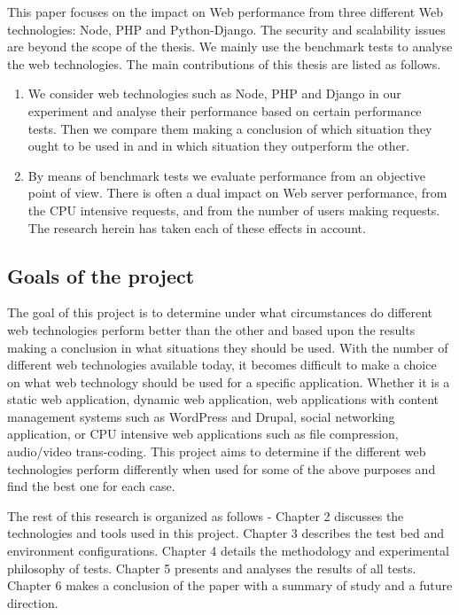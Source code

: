 \documentclass[../thesis.tex]{subfiles}
\begin{document}
This paper focuses on the impact on Web performance from three different Web technologies: Node, PHP and Python-Django. The security and scalability issues are beyond the scope of the thesis. We mainly use the benchmark tests to analyse the web technologies. The main contributions of this thesis are listed as follows. 
\vspace{5mm}
\begin{enumerate}
    \item We consider web technologies such as Node, PHP and Django in our experiment and analyse their performance based on certain performance tests. Then we compare them making a conclusion of which situation they ought to be used in and in which situation they outperform the other. 
    \item By means of benchmark tests we evaluate performance from an objective point of view. There is often a dual impact on Web server performance, from the CPU intensive requests, and from the number of users making requests. The research herein has taken each of these effects in account.
\end{enumerate}
\subsection{Goals of the project}
The goal of this project is to determine under what circumstances do different web technologies perform better than the other and based upon the results making a conclusion in what situations they should be used. With the number of different web technologies available today, it becomes difficult to make a choice on what web technology should be used for a specific application. Whether it is a static web application, dynamic web application, web applications with content management systems such as WordPress and Drupal, social networking application, or CPU intensive web applications such as file compression, audio/video trans-coding. This project aims to determine if the different web technologies perform differently when used for some of the above purposes and find the best one for each case.
\linebreak

The rest of this research is organized as follows - Chapter 2 discusses the technologies and tools used in this project. Chapter 3 describes the test bed and environment configurations. Chapter 4 details the methodology and experimental philosophy of tests. Chapter 5 presents and analyses the results of all tests. Chapter 6 makes a conclusion of the paper with a summary of study and a future direction.
\end{document}

